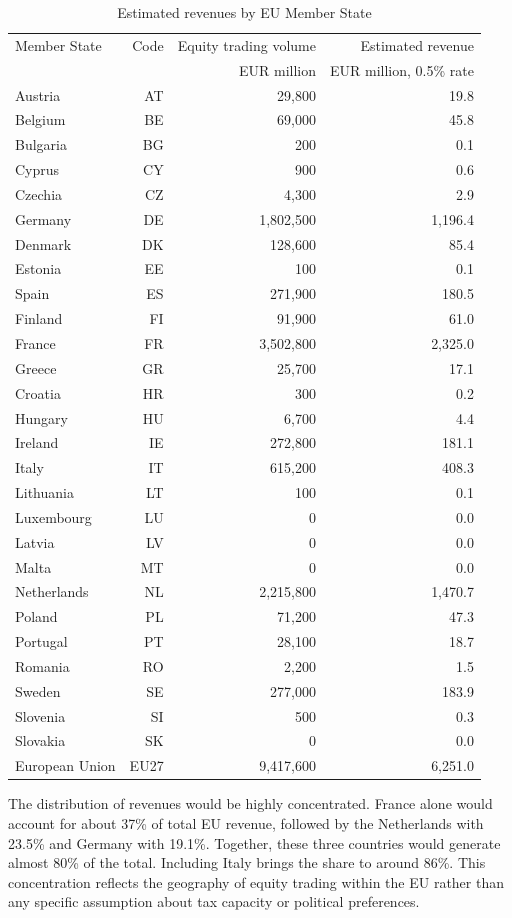 \documentclass[../../main]{subfiles}
\begin{document}
\begin{longtable}{lrrr}
\caption{Estimated revenues by EU Member State}
\label{tab:revenues_member_states}\\
\hline
Member State & Code & Equity trading volume & Estimated revenue \\
             &      & EUR million & EUR million, 0.5\% rate \\
\hline
Austria & AT & 29,800 & 19.8 \\
Belgium & BE & 69,000 & 45.8 \\
Bulgaria & BG & 200 & 0.1 \\
Cyprus & CY & 900 & 0.6 \\
Czechia & CZ & 4,300 & 2.9 \\
Germany & DE & 1,802,500 & 1,196.4 \\
Denmark & DK & 128,600 & 85.4 \\
Estonia & EE & 100 & 0.1 \\
Spain & ES & 271,900 & 180.5 \\
Finland & FI & 91,900 & 61.0 \\
France & FR & 3,502,800 & 2,325.0 \\
Greece & GR & 25,700 & 17.1 \\
Croatia & HR & 300 & 0.2 \\
Hungary & HU & 6,700 & 4.4 \\
Ireland & IE & 272,800 & 181.1 \\
Italy & IT & 615,200 & 408.3 \\
Lithuania & LT & 100 & 0.1 \\
Luxembourg & LU & 0 & 0.0 \\
Latvia & LV & 0 & 0.0 \\
Malta & MT & 0 & 0.0 \\
Netherlands & NL & 2,215,800 & 1,470.7 \\
Poland & PL & 71,200 & 47.3 \\
Portugal & PT & 28,100 & 18.7 \\
Romania & RO & 2,200 & 1.5 \\
Sweden & SE & 277,000 & 183.9 \\
Slovenia & SI & 500 & 0.3 \\
Slovakia & SK & 0 & 0.0 \\
\hline
European Union & EU27 & 9,417,600 & 6,251.0 \\
\hline
\end{longtable}


The distribution of revenues would be highly concentrated. France alone would account for about 37\% of total EU revenue, followed by the Netherlands with 23.5\% and Germany with 19.1\%. Together, these three countries would generate almost 80\% of the total. Including Italy brings the share to around 86\%. This concentration reflects the geography of equity trading within the EU rather than any specific assumption about tax capacity or political preferences.
\end{document}
